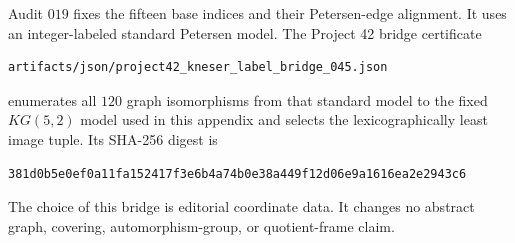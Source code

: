 Audit \(019\) fixes the fifteen base indices and their Petersen-edge
alignment. It uses an integer-labeled standard Petersen model. The
Project 42 bridge certificate

\begin{verbatim}
artifacts/json/project42_kneser_label_bridge_045.json
\end{verbatim}

enumerates all \(120\) graph isomorphisms from that standard model to the
fixed \(KG(5,2)\) model used in this appendix and selects the
lexicographically least image tuple. Its SHA-256 digest is

\begin{verbatim}
381d0b5e0ef0a11fa152417f3e6b4a74b0e38a449f12d06e9a1616ea2e2943c6
\end{verbatim}

The choice of this bridge is editorial coordinate data. It changes no
abstract graph, covering, automorphism-group, or quotient-frame claim.
